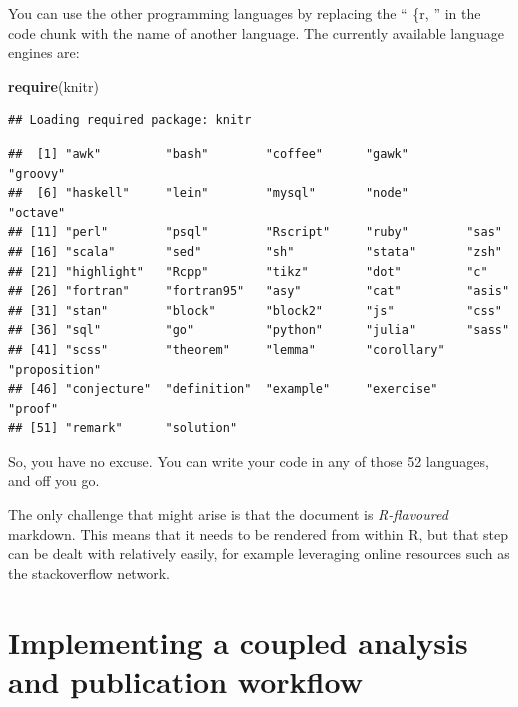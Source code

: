 \documentclass[11pt,]{article}
\newenvironment{Shaded}{\begin{snugshade}}{\end{snugshade}}
\newcommand{\KeywordTok}[1]{\textcolor[rgb]{0.13,0.29,0.53}{\textbf{#1}}}
\newcommand{\NormalTok}[1]{#1}
\newcommand{\OperatorTok}[1]{\textcolor[rgb]{0.81,0.36,0.00}{\textbf{#1}}}
\begin{document}
You can use the other programming languages by replacing the `` \{r, '' in the code chunk with the name of another language. The currently available language engines are:

\begin{Shaded}
\begin{Highlighting}[]
\KeywordTok{require}\NormalTok{(knitr)}
\end{Highlighting}
\end{Shaded}

\begin{verbatim}
## Loading required package: knitr
\end{verbatim}

\begin{Shaded}
\end{Shaded}

\begin{verbatim}
##  [1] "awk"         "bash"        "coffee"      "gawk"        "groovy"     
##  [6] "haskell"     "lein"        "mysql"       "node"        "octave"     
## [11] "perl"        "psql"        "Rscript"     "ruby"        "sas"        
## [16] "scala"       "sed"         "sh"          "stata"       "zsh"        
## [21] "highlight"   "Rcpp"        "tikz"        "dot"         "c"          
## [26] "fortran"     "fortran95"   "asy"         "cat"         "asis"       
## [31] "stan"        "block"       "block2"      "js"          "css"        
## [36] "sql"         "go"          "python"      "julia"       "sass"       
## [41] "scss"        "theorem"     "lemma"       "corollary"   "proposition"
## [46] "conjecture"  "definition"  "example"     "exercise"    "proof"      
## [51] "remark"      "solution"
\end{verbatim}

So, you have no excuse. You can write your code in any of those 52 languages, and off you go.

The only challenge that might arise is that the document is \emph{R-flavoured} markdown. This means that it needs to be rendered from within R, but that step can be dealt with relatively easily, for example leveraging online resources such as the stackoverflow network.

\hypertarget{implementing-a-coupled-analysis-and-publication-workflow}{%
\section{Implementing a coupled analysis and publication workflow}\label{implementing-a-coupled-analysis-and-publication-workflow}}
\end{document}
